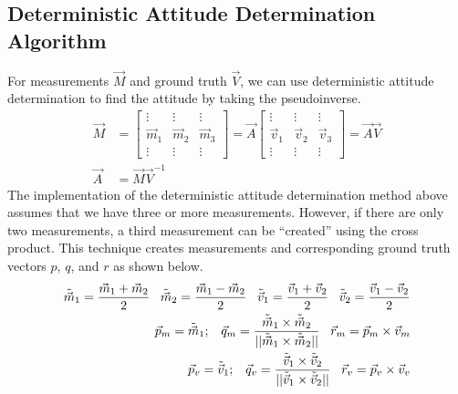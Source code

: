 \subsection{Deterministic Attitude Determination Algorithm}
For measurements $\Vec{M}$ and ground truth $\Vec{V}$, we can use deterministic attitude determination to find the attitude by taking the pseudoinverse.
\begin{align*}
    \Vec{M} &= 
    \begin{bmatrix}
        \vdots & \vdots & \vdots\\
        \Vec{m}_{1} & \Vec{m}_{2} & \Vec{m}_{3}\\
        \vdots & \vdots & \vdots
    \end{bmatrix} =
    \Vec{A} \begin{bmatrix}
        \vdots & \vdots & \vdots\\
        \Vec{v}_{1} & \Vec{v}_{2} & \Vec{v}_{3}\\
        \vdots & \vdots & \vdots
    \end{bmatrix} =
    \Vec{A} \Vec{V} \\
    \Vec{A} &= \Vec{M} \Vec{V}^{-1}
\end{align*}
The implementation of the deterministic attitude determination method above assumes that we have three or more measurements. However, if there are only two measurements, a third measurement can be ``created'' using the cross product. This technique creates measurements and corresponding ground truth vectors $p$, $q$, and $r$ as shown below.
\begin{align*}
    \Tilde{\Vec{{m}}}_1 = \frac{\Vec{m}_1 + \Vec{m}_2}{2} \;\;\;
    \Tilde{\Vec{{m}}}_2 = \frac{\Vec{m}_1 - \Vec{m}_2}{2} \;\;\;
    \Tilde{\Vec{{v}}}_1 = \frac{\Vec{v}_1 + \Vec{v}_2}{2} \;\;\;
    \Tilde{\Vec{{v}}}_2 = \frac{\Vec{v}_1 - \Vec{v}_2}{2} \\
    \Vec{p}_m = \Tilde{\Vec{{m}}}_1; \;\;\;
    \Vec{{q}}_m = \frac{\Tilde{\Vec{{m}}}_1 \times \Tilde{\Vec{{m}}}_2}{||\Tilde{\Vec{{m}}}_1 \times \Tilde{\Vec{{m}}}_2||} \;\;\;
    \Vec{{r}}_m = \Vec{p}_m \times \Vec{v}_m \\
    \Vec{p}_v = \Tilde{\Vec{{v}}}_1; \;\;\;
    \Vec{{q}}_v = \frac{\Tilde{\Vec{{v}}}_1 \times \Tilde{\Vec{{v}}}_2}{||\Tilde{\Vec{{v}}}_1 \times \Tilde{\Vec{{v}}}_2||} \;\;\;
    \Vec{{r}}_v = \Vec{p}_v \times \Vec{v}_v \\
\end{align*}


